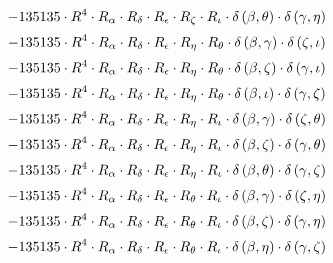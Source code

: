 \begin{subequations}
\begin{gather}
 \\[0.2em] \notag 		 - 135135 \cdot R^{4} \cdot R_{\alpha{}} \cdot R_{\delta{}} \cdot R_{\epsilon{}} \cdot R_{\zeta{}} \cdot R_{\iota{}} \cdot \delta{}\left(\beta{}, \theta{}\right) \cdot \delta{}\left(\gamma{}, \eta{}\right) 
 \\[0.2em] \notag 		 - 135135 \cdot R^{4} \cdot R_{\alpha{}} \cdot R_{\delta{}} \cdot R_{\epsilon{}} \cdot R_{\eta{}} \cdot R_{\theta{}} \cdot \delta{}\left(\beta{}, \gamma{}\right) \cdot \delta{}\left(\zeta{}, \iota{}\right) 
 \\[0.2em] \notag 		 - 135135 \cdot R^{4} \cdot R_{\alpha{}} \cdot R_{\delta{}} \cdot R_{\epsilon{}} \cdot R_{\eta{}} \cdot R_{\theta{}} \cdot \delta{}\left(\beta{}, \zeta{}\right) \cdot \delta{}\left(\gamma{}, \iota{}\right) 
 \\[0.2em] \notag 		 - 135135 \cdot R^{4} \cdot R_{\alpha{}} \cdot R_{\delta{}} \cdot R_{\epsilon{}} \cdot R_{\eta{}} \cdot R_{\theta{}} \cdot \delta{}\left(\beta{}, \iota{}\right) \cdot \delta{}\left(\gamma{}, \zeta{}\right) 
 \\[0.2em] \notag 		 - 135135 \cdot R^{4} \cdot R_{\alpha{}} \cdot R_{\delta{}} \cdot R_{\epsilon{}} \cdot R_{\eta{}} \cdot R_{\iota{}} \cdot \delta{}\left(\beta{}, \gamma{}\right) \cdot \delta{}\left(\zeta{}, \theta{}\right) 
 \\[0.2em] \notag 		 - 135135 \cdot R^{4} \cdot R_{\alpha{}} \cdot R_{\delta{}} \cdot R_{\epsilon{}} \cdot R_{\eta{}} \cdot R_{\iota{}} \cdot \delta{}\left(\beta{}, \zeta{}\right) \cdot \delta{}\left(\gamma{}, \theta{}\right) 
 \\[0.2em] \notag 		 - 135135 \cdot R^{4} \cdot R_{\alpha{}} \cdot R_{\delta{}} \cdot R_{\epsilon{}} \cdot R_{\eta{}} \cdot R_{\iota{}} \cdot \delta{}\left(\beta{}, \theta{}\right) \cdot \delta{}\left(\gamma{}, \zeta{}\right) 
 \\[0.2em] \notag 		 - 135135 \cdot R^{4} \cdot R_{\alpha{}} \cdot R_{\delta{}} \cdot R_{\epsilon{}} \cdot R_{\theta{}} \cdot R_{\iota{}} \cdot \delta{}\left(\beta{}, \gamma{}\right) \cdot \delta{}\left(\zeta{}, \eta{}\right) 
 \\[0.2em] \notag 		 - 135135 \cdot R^{4} \cdot R_{\alpha{}} \cdot R_{\delta{}} \cdot R_{\epsilon{}} \cdot R_{\theta{}} \cdot R_{\iota{}} \cdot \delta{}\left(\beta{}, \zeta{}\right) \cdot \delta{}\left(\gamma{}, \eta{}\right) 
 \\[0.2em] \notag 		 - 135135 \cdot R^{4} \cdot R_{\alpha{}} \cdot R_{\delta{}} \cdot R_{\epsilon{}} \cdot R_{\theta{}} \cdot R_{\iota{}} \cdot \delta{}\left(\beta{}, \eta{}\right) \cdot \delta{}\left(\gamma{}, \zeta{}\right) 

\end{gather}
\end{subequations}
